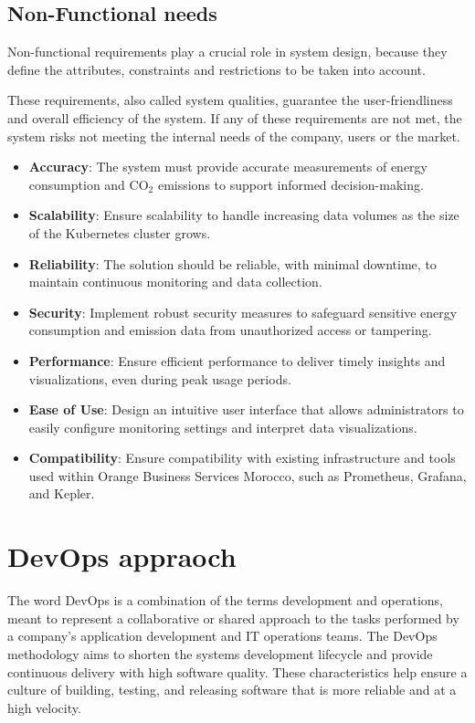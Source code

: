 \subsection{Non-Functional needs}

Non-functional requirements play a crucial role in system design,
because they define the attributes, constraints and restrictions to be taken into account.

These requirements, also called system qualities, guarantee the
user-friendliness and overall efficiency of the system. If any of these requirements are not met,
the system risks not meeting the internal needs of the company, users
or the market.

\begin{itemize}
  \item \textbf{Accuracy}: The system must provide accurate measurements of energy consumption and CO$_2$ emissions to support informed decision-making.
  \item \textbf{Scalability}: Ensure scalability to handle increasing data volumes as the size of the Kubernetes cluster grows.
  \item \textbf{Reliability}: The solution should be reliable, with minimal downtime, to maintain continuous monitoring and data collection.
  \item \textbf{Security}: Implement robust security measures to safeguard sensitive energy consumption and emission data from unauthorized access or tampering.
  \item \textbf{Performance}: Ensure efficient performance to deliver timely insights and visualizations, even during peak usage periods.
  \item \textbf{Ease of Use}: Design an intuitive user interface that allows administrators to easily configure monitoring settings and interpret data visualizations.
  \item \textbf{Compatibility}: Ensure compatibility with existing infrastructure and tools used within Orange Business Services Morocco, such as Prometheus, Grafana, and Kepler.
\end{itemize}


\section{DevOps appraoch}
The word DevOps is a combination of the terms development and operations, meant to represent a collaborative or shared approach to the tasks performed by a company's application development and IT operations teams.
The DevOps methodology aims to shorten the systems development lifecycle and provide continuous delivery with high software quality. These characteristics help ensure a culture of building, testing, and releasing software that is more reliable and at a high velocity.

